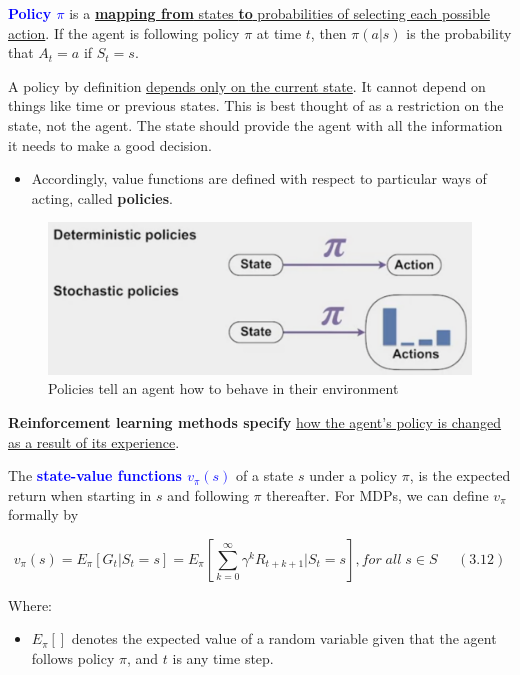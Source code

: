 \documentclass[12pt, a4paper]{article}
\begin{document}
\textcolor{blue}{\textbf{Policy \(\pi\)}} is a \uline{\textbf{mapping from} states \textbf{to} probabilities of selecting each possible action}. If the agent is
following policy \(\pi\) at time \(t\), then \(\pi(a|s)\) is the
probability that \(A_t = a\) if \(S_t = s\).

A policy by definition \uline{depends only on the current state}. It cannot depend on things like time or previous states. This is best thought of as a restriction on the state, not the agent. The state should provide the agent with all the information it needs to make a good decision.

\begin{itemize}
  \item Accordingly, value functions are defined with respect to particular ways of acting, called \textbf{policies}.
\end{itemize}

\begin{figure}[H]
  \centering  %
    \includegraphics[width=0.8\columnwidth]{images/deterministic-and-stochastic-policies.png}
    \caption{Policies tell an agent how to behave in their environment}
    \label{fig:value-function-predicting-rewards}
\end{figure}

\textbf{Reinforcement learning methods specify} \uline{how the agent's policy is changed as a result of its experience}.

The \textcolor{blue}{\textbf{state-value functions \(v_\pi(s)\)}} of a state \(s\) under a policy \(\pi\), is the expected return when starting in \(s\) and following \(\pi\) thereafter. For MDPs, we can define \(v_\pi\) formally by

\[v_\pi(s) = E_\pi[G_t|S_t=s] = E_\pi[\sum_{k=0}^{\infty} \gamma^k R_{t+k+1} | S_t = s], for\;all\; s \in S \;\;\;\;\;(3.12)\]

Where:

\begin{itemize}
\item
  \(E_\pi[]\) denotes the expected value of a random variable given that
  the agent follows policy \(\pi\), and \(t\) is any time step.
\end{itemize}
\end{document}
